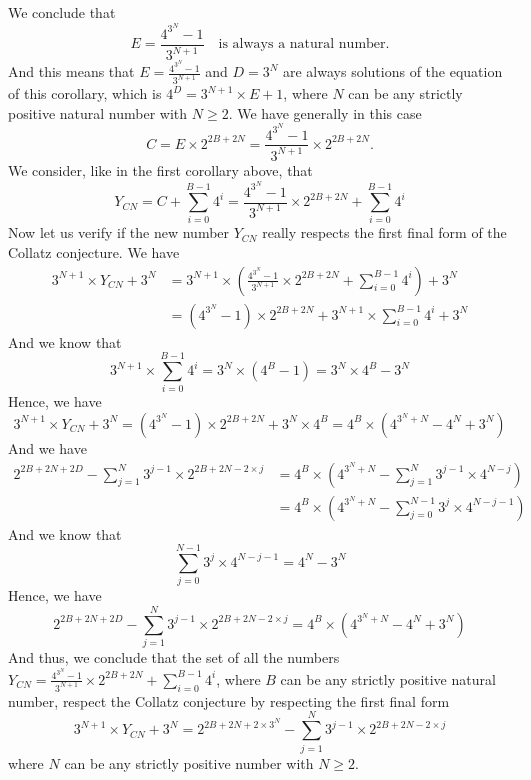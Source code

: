 \documentclass[11pt,a4paper]{article}
\theoremstyle{definition}
\begin{document}
We conclude that
\begin{equation}
E=\frac{4^{3^{N}}-1}{3^{N+1}}\quad\text{is always a natural number.}
\end{equation}
And this means that $E=\frac{4^{3^{N}}-1}{3^{N+1}}$ and $D=3^{N}$ are always solutions of the
equation of this corollary, which is $4^{D}=3^{N+1}\times E+1$, where $N$ can be any
strictly positive natural number with $N\ge 2$. We have generally in this case
\begin{equation}
C=E\times 2^{2B+2N}=\frac{4^{3^{N}}-1}{3^{N+1}}\times 2^{2B+2N}.
\end{equation}
We consider, like in the first corollary above, that
\begin{equation}
Y_{CN}=C+\sum_{i=0}^{B-1}4^{i}=\frac{4^{3^{N}}-1}{3^{N+1}}\times 2^{2B+2N}+\sum_{i=0}^{B-1}4^{i}
\end{equation}
Now let us verify if the new number $Y_{CN}$ really respects the first final form of the
Collatz conjecture. We have
\begin{equation}
\begin{split}
3^{N+1}\times Y_{CN}+3^{N}&=3^{N+1}\times\left(\frac{4^{3^{N}}-1}{3^{N+1}}\times 2^{2B+2N}+\sum_{i=0}^{B-1}4^{i}\right)+3^{N}\\
&=\left(4^{3^{N}}-1\right)\times 2^{2B+2N}+3^{N+1}\times\sum_{i=0}^{B-1}4^{i}+3^{N}
\end{split}
\end{equation}
And we know that
\begin{equation}
3^{N+1}\times\sum_{i=0}^{B-1}4^{i}=3^{N}\times\left(4^{B}-1\right)=3^{N}\times 4^{B}-3^{N}
\end{equation}
Hence, we have
\begin{equation}
3^{N+1}\times Y_{CN}+3^{N}=\left(4^{3^{N}}-1\right)\times 2^{2B+2N}+3^{N}\times 4^{B}=4^{B}\times\left(4^{3^{N}+N}-4^{N}+3^{N}\right)
\end{equation}
And we have
\begin{equation}
\begin{split}
2^{2B+2N+2D}-\sum_{j=1}^{N}3^{j-1}\times 2^{2B+2N-2\times j}
&=4^{B}\times\left(4^{3^{N}+N}-\sum_{j=1}^{N}3^{j-1}\times 4^{N-j}\right)\\
&=4^{B}\times\left(4^{3^{N}+N}-\sum_{j=0}^{N-1}3^{j}\times 4^{N-j-1}\right)
\end{split}
\end{equation}
And we know that
\begin{equation}
\sum_{j=0}^{N-1}3^{j}\times 4^{N-j-1}=4^{N}-3^{N}
\end{equation}
Hence, we have
\begin{equation}
2^{2B+2N+2D}-\sum_{j=1}^{N}3^{j-1}\times 2^{2B+2N-2\times j}=4^{B}\times\left(4^{3^{N}+N}-4^{N}+3^{N}\right)
\end{equation}
And thus, we conclude that the set of all the numbers
$Y_{CN}=\frac{4^{3^{N}}-1}{3^{N+1}}\times 2^{2B+2N}+\sum_{i=0}^{B-1}4^{i}$, where $B$ can be
any strictly positive natural number, respect the Collatz conjecture by respecting the first
final form
\[3^{N+1}\times Y_{CN}+3^{N}=2^{2B+2N+2\times 3^{N}}-\sum_{j=1}^{N}3^{j-1}\times 2^{2B+2N-2\times j}\]
where $N$ can be any strictly positive number with $N\ge 2$.
\end{document}
